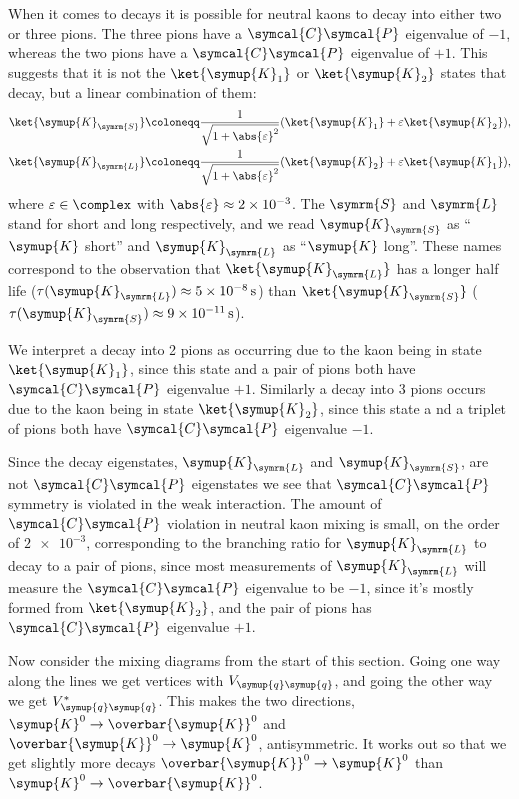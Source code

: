 \documentclass[fleqn]{NotesClass}
\newcommand{\Pparticle}[1]{\symup{#1}}
\newcommand{\Pq}{\ensuremath{\Pparticle{q}}}
\newcommand{\PKzero}{\ensuremath{\Pparticle{K}^0}}
\newcommand{\PK}{\ensuremath{\Pparticle{K}}}
\newcommand{\PKshort}{\ensuremath{\Pparticle{K}_{\symrm{S}}}}
\newcommand{\PKlong}{\ensuremath{\Pparticle{K}_{\symrm{L}}}}
\newcommand{\APantiparticle}[1]{\overbar{#1}}
\newcommand{\APKzero}{\ensuremath{\APantiparticle{\Pparticle{K}}^0}}
\newcommand{\parity}{\symcal{P}}
\newcommand{\chargeConjugation}{\symcal{C}}
\begin{document}
    When it comes to decays it is possible for neutral kaons to decay into either two or three pions.
    The three pions have a \(\chargeConjugation\parity\) eigenvalue of \(-1\), whereas the two pions have a \(\chargeConjugation\parity\) eigenvalue of \(+1\).
    This suggests that it is not the \(\ket{\PK_1}\) or \(\ket{\PK_2}\) states that decay, but a linear combination of them:
    \begin{align}
        \ket{\PKshort} &\coloneqq \frac{1}{\sqrt{1 + \abs{\varepsilon}^2}} (\ket{\PK_1} + \varepsilon\ket{\PK_2}),\\
        \ket{\PKlong} &\coloneqq \frac{1}{\sqrt{1 + \abs{\varepsilon}^2}} (\ket{\PK_2} + \varepsilon\ket{\PK_1}),
    \end{align}
    where \(\varepsilon \in \complex\) with \(\abs{\varepsilon} \approx \num{2e-3}\).
    The \(\symrm{S}\) and \(\symrm{L}\) stand for short and long respectively, and we read \(\PKshort\) as \enquote{\(\PK\) short} and \(\PKlong\) as \enquote{\(\PK\) long}.
    These names correspond to the observation that \(\ket{\PKlong}\) has a longer half life (\(\tau(\PKlong) \approx \qty{5e-8}{\second}\)) than \(\ket{\PKshort}\) (\(\tau(\PKshort) \approx \qty{9e-11}{\second}\)).
    
    We interpret a decay into 2 pions as occurring due to the kaon being in state \(\ket{\PK_1}\), since this state and a pair of pions both have \(\chargeConjugation\parity\) eigenvalue \(+1\).
    Similarly a decay into 3 pions occurs due to the kaon being in state \(\ket{\PK_2}\), since this state a nd a triplet of pions both have \(\chargeConjugation\parity\) eigenvalue \(-1\).
    
    Since the decay eigenstates, \(\PKlong\) and \(\PKshort\), are not \(\chargeConjugation\parity\) eigenstates we see that \(\chargeConjugation\parity\) symmetry is violated in the weak interaction.
    The amount of \(\chargeConjugation\parity\) violation in neutral kaon mixing is small, on the order of \(\num{2e-3}\), corresponding to the branching ratio for \(\PKlong\) to decay to a pair of pions, since most measurements of \(\PKlong\) will measure the \(\chargeConjugation\parity\) eigenvalue to be \(-1\), since it's mostly formed from \(\ket{\PK_2}\), and the pair of pions has \(\chargeConjugation\parity\) eigenvalue \(+1\).
    
    Now consider the mixing diagrams from the start of this section.
    Going one way along the lines we get vertices with \(V_{\Pq\Pq}\), and going the other way we get \(V_{\Pq\Pq}^*\).
    This makes the two directions, \(\PKzero \to \APKzero\) and \(\APKzero \to \PKzero\), antisymmetric.
    It works out so that we get slightly more decays \(\APKzero \to \PKzero\) than \(\PKzero \to \APKzero\).
    
\end{document}
